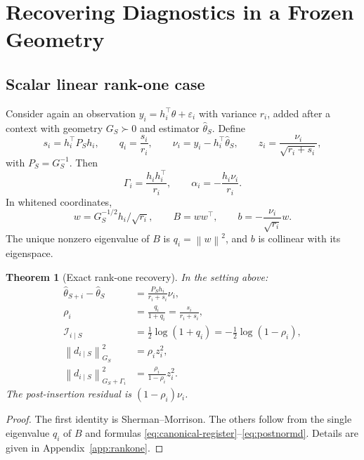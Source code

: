 \documentclass[10pt,a4paper]{article}
\newtheorem{theorem}{Theorem}[section]
\newcommand{\norm}[1]{\left\lVert #1\right\rVert}
\begin{document}
\section{Recovering Diagnostics in a Frozen Geometry}
\subsection{Scalar linear rank-one case}
\label{subsec:rankone-recovery}
Consider again an observation $y_i=h_i^\top\theta+\varepsilon_i$ with variance $r_i$, added after a context with geometry $G_S\succ0$ and estimator $\widehat\theta_S$. Define
\begin{equation}
s_i=h_i^\top P_Sh_i,
\qquad
q_i=\frac{s_i}{r_i},
\qquad
\nu_i=y_i-h_i^\top\widehat\theta_S,
\qquad
z_i=\frac{\nu_i}{\sqrt{r_i+s_i}},
\label{eq:q-z}
\end{equation}
with $P_S=G_S^{-1}$. Then
\[
\Gamma_i=\frac{h_ih_i^\top}{r_i},
\qquad
\alpha_i=-\frac{h_i\nu_i}{r_i}.
\]
In whitened coordinates,
\[
w=G_S^{-1/2}h_i/\sqrt{r_i},
\qquad
B=ww^\top,
\qquad
b=-\frac{\nu_i}{\sqrt{r_i}}w.
\]
The unique nonzero eigenvalue of $B$ is $q_i=\norm{w}^2$, and $b$ is collinear with its eigenspace.

\begin{theorem}[Exact rank-one recovery]
In the setting above:
\begin{align}
\widehat\theta_{S+i}-\widehat\theta_S
&=\frac{P_Sh_i}{r_i+s_i}\nu_i,\label{eq:rankone-d}\\
\rho_i
&=\frac{q_i}{1+q_i}=\frac{s_i}{r_i+s_i},\label{eq:rho}\\
\mathcal I_{i\mid S}
&=\frac12\log(1+q_i)=-\frac12\log(1-\rho_i),\label{eq:rankone-info}\\
\norm{d_{i\mid S}}_{G_S}^2
&=\rho_i z_i^2,\label{eq:rankone-contextnorm}\\
\norm{d_{i\mid S}}_{G_S+\Gamma_i}^2
&=\frac{\rho_i}{1-\rho_i}z_i^2.\label{eq:rankone-postnorm}
\end{align}
The post-insertion residual is $(1-\rho_i)\nu_i$.
\end{theorem}

\begin{proof}
The first identity is Sherman--Morrison. The others follow from the single eigenvalue $q_i$ of $B$ and formulas \eqref{eq:canonical-register}--\eqref{eq:postnormd}. Details are given in Appendix~\ref{app:rankone}.
\end{proof}
\end{document}
